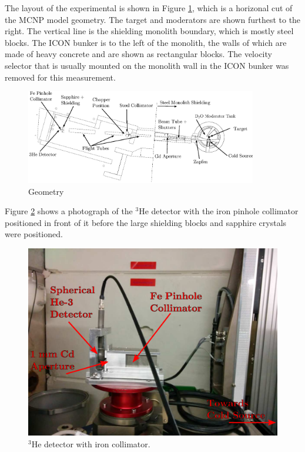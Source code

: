 \documentclass[5p,12pt]{elsarticle}
\begin{document}
The layout of the experimental is shown in Figure \ref{fig:geom}, which is a horizonal cut of the MCNP model geometry.  The target and moderators are shown furthest to the right.  The vertical line is the shielding monolith boundary, which is mostly steel blocks.  The ICON bunker is to the left of the monolith, the walls of which are made of heavy concrete and are shown as rectangular blocks.  The velocity selector that is usually mounted on the monolith wall in the ICON bunker was removed for this measurement.

\begin{figure}[ht!] 
  \centering
    \includegraphics[width=0.9\textwidth]{graphics/geom_bw_labels.eps}
     \caption{Geometry \label{fig:geom} }
\end{figure}

Figure \ref{fig:det} shows a photograph of the $^3$He detector with the iron pinhole collimator positioned in front of it before the large shielding blocks and sapphire crystals were positioned.

\begin{figure}[h!] 
  \centering
    \includegraphics[width=\columnwidth]{graphics/det.eps}
     \caption{$^3$He detector with iron collimator. \label{fig:det}}
\end{figure}
\end{document}
